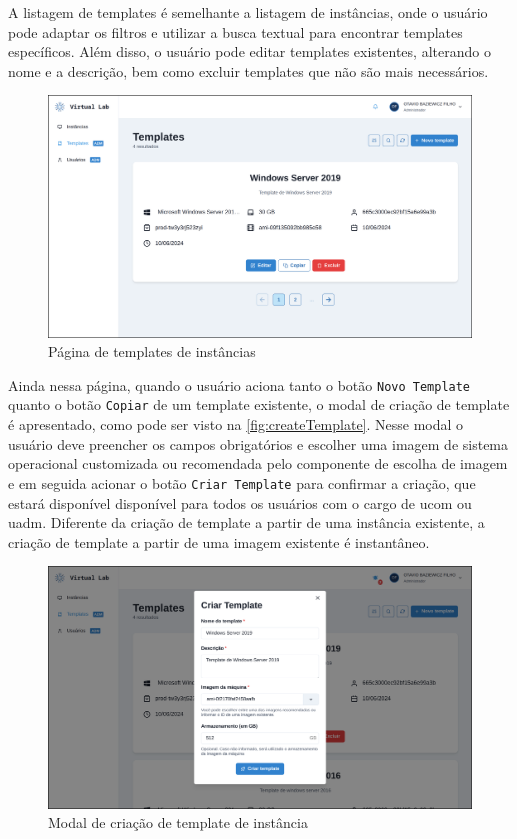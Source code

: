 A listagem de templates é semelhante a listagem de instâncias, onde o usuário pode adaptar os filtros e utilizar a busca textual para encontrar templates específicos. Além disso, o usuário pode editar templates existentes, alterando o nome e a descrição, bem como excluir templates que não são mais necessários.

\begin{figure}[H]
\caption{Página de templates de instâncias}
\label{fig:templatesPage}
\includegraphics[width=\textwidth]{capitulos/3-resultados/files/templates.png}
\end{figure}

Ainda nessa página, quando o usuário aciona tanto o botão \texttt{Novo Template} quanto o botão \texttt{Copiar} de um template existente, o modal de criação de template é apresentado, como pode ser visto na \autoref{fig:createTemplate}. Nesse modal o usuário deve preencher os campos obrigatórios e escolher uma imagem de sistema operacional customizada ou recomendada pelo componente de escolha de imagem e em seguida acionar o botão \texttt{Criar Template} para confirmar a criação, que estará disponível disponível para todos os usuários com o cargo de \gls{ucom} ou \gls{uadm}. Diferente da criação de template a partir de uma instância existente, a criação de template a partir de uma imagem existente é instantâneo.

\begin{figure}[H]
\caption{Modal de criação de template de instância}
\label{fig:createTemplate}
\includegraphics[width=\textwidth]{capitulos/3-resultados/files/create-template.png}
\end{figure}

